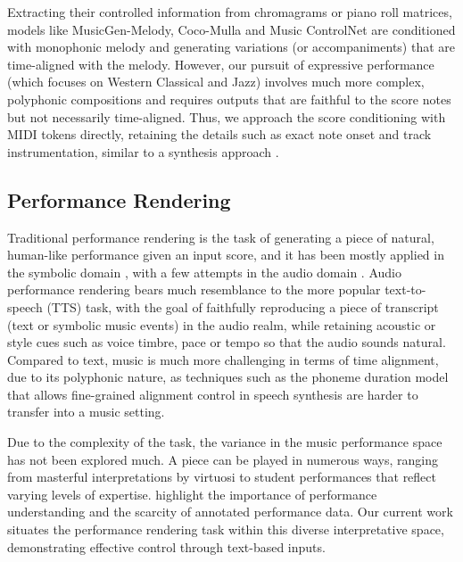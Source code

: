 Extracting their controlled information from chromagrams or piano roll matrices, models like MusicGen-Melody, Coco-Mulla and Music ControlNet are conditioned with monophonic melody and generating variations (or accompaniments) that are time-aligned with the melody. However, our pursuit of expressive performance (which focuses on Western Classical and Jazz) involves much more complex, polyphonic compositions and requires outputs that are faithful to the score notes but not necessarily time-aligned. Thus, we approach the score conditioning with MIDI tokens directly, retaining the details such as exact note onset and track instrumentation, similar to a synthesis approach \cite{Hawthorne2022Multi-instrumentDiffusion}.


\subsection{Performance Rendering}

Traditional performance rendering is the task of generating a piece of natural, human-like performance given an input score, and it has been mostly applied in the symbolic domain \cite{Bresin2002DirectorSystem,Maezawa2019RenderingRNN,Jeong2019VirtuosoNetPerformance,Zhang2024DExterModels}, with a few attempts in the audio domain \cite{Dong2022DeepSynthesis,Renault2022DifferentiableSynthesis}. 
Audio performance rendering bears much resemblance to the more popular text-to-speech (TTS) task, with the goal of faithfully reproducing a piece of transcript (text or symbolic music events) in the audio realm, while retaining acoustic or style cues such as voice timbre, pace or tempo so that the audio sounds natural. Compared to text, music is much more challenging in terms of time alignment, due to its polyphonic nature, as techniques such as the phoneme duration model \cite{Le2023VoiceboxScale} that allows fine-grained alignment control in speech synthesis are harder to transfer into a music setting. 

Due to the complexity of the task, the variance in the music performance space has not been explored much. A piece can be played in numerous ways, ranging from masterful interpretations by virtuosi to student performances that reflect varying levels of expertise. \citeauthor{Zhang2024LLaQoAssessment}  highlight the importance of performance understanding and the scarcity of annotated performance data.  Our current work situates the performance rendering task within this diverse interpretative space, demonstrating effective control through text-based inputs.

